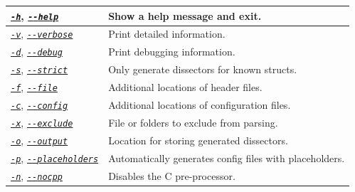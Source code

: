 \documentclass[A4paper,10pt,english]{sphinxmanual}
\begin{document}
\begin{tabulary}{\linewidth}{|L|L|}
\hline

{\hyperref[user/use:cmdoption-h]{\emph{\texttt{-h}}}}, {\hyperref[user/use:cmdoption-h]{\emph{\texttt{-{-}help}}}}
 & 
Show a help message and exit.
\\\hline

{\hyperref[user/use:cmdoption-v]{\emph{\texttt{-v}}}}, {\hyperref[user/use:cmdoption-v]{\emph{\texttt{-{-}verbose}}}}
 & 
Print detailed information.
\\\hline

{\hyperref[user/use:cmdoption-d]{\emph{\texttt{-d}}}}, {\hyperref[user/use:cmdoption-d]{\emph{\texttt{-{-}debug}}}}
 & 
Print debugging information.
\\\hline

{\hyperref[user/use:cmdoption-s]{\emph{\texttt{-s}}}}, {\hyperref[user/use:cmdoption-s]{\emph{\texttt{-{-}strict}}}}
 & 
Only generate dissectors for known structs.
\\\hline

{\hyperref[user/use:cmdoption-f]{\emph{\texttt{-f}}}}, {\hyperref[user/use:cmdoption-f]{\emph{\texttt{-{-}file}}}}
 & 
Additional locations of header files.
\\\hline

{\hyperref[user/use:cmdoption-c]{\emph{\texttt{-c}}}}, {\hyperref[user/use:cmdoption-c]{\emph{\texttt{-{-}config}}}}
 & 
Additional locations of configuration files.
\\\hline

{\hyperref[user/use:cmdoption-x]{\emph{\texttt{-x}}}}, {\hyperref[user/use:cmdoption-x]{\emph{\texttt{-{-}exclude}}}}
 & 
File or folders to exclude from parsing.
\\\hline

{\hyperref[user/use:cmdoption-o]{\emph{\texttt{-o}}}}, {\hyperref[user/use:cmdoption-o]{\emph{\texttt{-{-}output}}}}
 & 
Location for storing generated dissectors.
\\\hline

{\hyperref[user/use:cmdoption-p]{\emph{\texttt{-p}}}}, {\hyperref[user/use:cmdoption-p]{\emph{\texttt{-{-}placeholders}}}}
 & 
Automatically generates config files with placeholders.
\\\hline

{\hyperref[user/use:cmdoption-n]{\emph{\texttt{-n}}}}, {\hyperref[user/use:cmdoption-n]{\emph{\texttt{-{-}nocpp}}}}
 & 
Disables the C pre-processor.
\\\hline


\end{tabulary}
\end{document}
